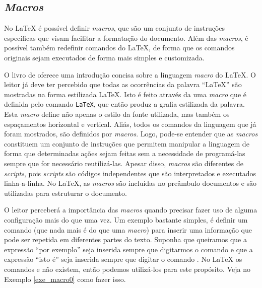 

\subsection{\textit{Macros}}
\label{sec:macros}

No \LaTeX{} é possível definir \textit{macros}, que são um conjunto de instruções específicas que visam facilitar a formatação do documento. Além das \textit{macros}, é possível também redefinir comandos do \LaTeX{}, de forma que os comandos originais sejam executados de forma mais simples e customizada.

O livro de  oferece uma introdução concisa sobre a linguagem \textit{macro} do \LaTeX{}. O leitor já deve ter percebido que todas as ocorrências da palavra ``LaTeX'' são mostradas na forma estilizada \LaTeX{}. Isto é feito através da uma \textit{macro} que é definida pelo comando \texttt{\LaTeX{}}, que então produz a grafia estilizada da palavra. Esta \textit{macro} define não apenas o estilo da fonte utilizada, mas também os espaçamentos horizontal e vertical. Aliás, todos os comandos da linguagem que já foram mostrados, são definidos por \textit{macros}. Logo, pode-se entender que as \textit{macros} constituem um conjunto de instruções que permitem manipular a linguagem de forma que determinadas ações sejam feitas sem a necessidade de programá-las sempre que for necessário reutilizá-las. Apesar disso, \textit{macros} são diferentes de \textit{scripts}, pois \textit{scripts} são códigos independentes que são interpretados e executados linha-a-linha. No \LaTeX{}, as \textit{macros} são incluídas no preâmbulo documentos e são utilizadas para estruturar o documento.

O leitor perceberá a importância das \textit{macros} quando precisar fazer uso de alguma configuração mais do que uma vez. Um exemplo bastante simples, é definir um comando (que nada mais é do que uma \textit{macro}) para inserir uma informação que pode ser repetida em diferentes partes do texto. Suponha que queiramos que a expressão ``por exemplo'' seja inserida sempre que digitarmos o comando \texttt{\eg} e que a expressão ``isto é'' seja inserida sempre que digitar o comando \texttt{\ie}. No \LaTeX{} os comandos \texttt{\eg} e \texttt{\ie} não existem, então podemos utilizá-los para este propósito. Veja no Exemplo \ref{exe_macro0} como fazer isso.

